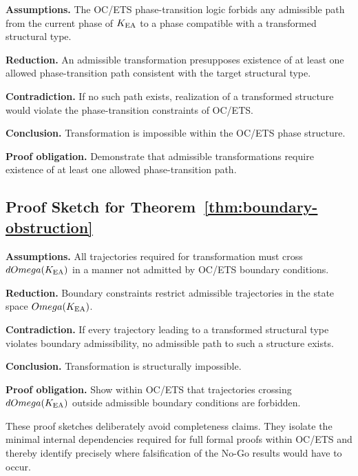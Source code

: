 \textbf{Assumptions.}
The OC/ETS phase-transition logic forbids any admissible path from the
current phase of $K_{\mathrm{EA}}$ to a phase compatible with a transformed structural
type.

\textbf{Reduction.}
An admissible transformation presupposes existence of at least one allowed
phase-transition path consistent with the target structural type.

\textbf{Contradiction.}
If no such path exists, realization of a transformed structure would
violate the phase-transition constraints of OC/ETS.

\textbf{Conclusion.}
Transformation is impossible within the OC/ETS phase structure.

\textbf{Proof obligation.}
Demonstrate that admissible transformations require existence of at least
one allowed phase-transition path.

\subsection*{Proof Sketch for Theorem~\ref{thm:boundary-obstruction}}

\textbf{Assumptions.}
All trajectories required for transformation must cross $dOmega(K_{\mathrm{EA}})$ in a
manner not admitted by OC/ETS boundary conditions.

\textbf{Reduction.}
Boundary constraints restrict admissible trajectories in the state space
$Omega(K_{\mathrm{EA}})$.

\textbf{Contradiction.}
If every trajectory leading to a transformed structural type violates
boundary admissibility, no admissible path to such a structure exists.

\textbf{Conclusion.}
Transformation is structurally impossible.

\textbf{Proof obligation.}
Show within OC/ETS that trajectories crossing $dOmega(K_{\mathrm{EA}})$ outside
admissible boundary conditions are forbidden.

\begin{remark}
These proof sketches deliberately avoid completeness claims. They isolate
the minimal internal dependencies required for full formal proofs within
OC/ETS and thereby identify precisely where falsification of the No-Go
results would have to occur.
\end{remark}
